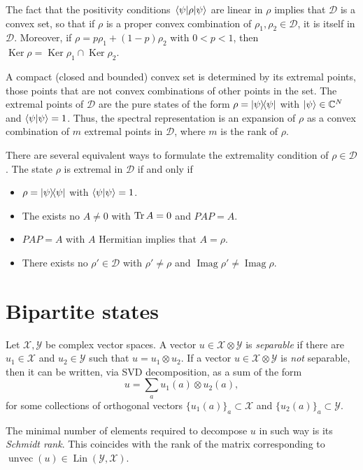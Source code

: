 \documentclass[12pt]{report}
\newcommand{\on}[1]{\operatorname{#1}}
\newcommand{\calY}{{\mathcal{Y}}}
\newcommand{\calX}{{\mathcal{X}}}
\DeclareMathOperator{\Ker}{Ker}
\DeclareMathOperator{\Imag}{Imag}
\DeclareMathOperator{\Lin}{Lin}
\begin{document}
The fact that the positivity conditions $\mel\psi\rho\psi$ are linear in $\rho$ implies that $\mathcal D$ is a convex set, so that if $\rho$ is a proper convex combination of $\rho_1, \rho_2\in \mathcal D$, it is itself in $\mathcal D$.
Moreover, if $\rho=p \rho_1 + (1-p)\rho_2$ with $0<p<1$, then
$\Ker\rho = \Ker\rho_1 \cap \Ker\rho_2$.

A compact (closed and bounded) convex set is determined by its extremal points,
those points that are not convex combinations of other points in the set.
The extremal points of $\mathcal D$ are the pure states of the form
$\rho=\ketbra\psi$ with $\ket\psi\in\mathbb C^N$ and $\braket\psi=1$.
Thus, the spectral representation is an expansion of $\rho$ as a convex combination of $m$ extremal points in $\mathcal D$, where $m$ is the rank of $\rho$.

There are several equivalent ways to formulate the extremality condition of $\rho \in\mathcal D$.
The state $\rho$ is extremal in $\mathcal D$ if and only if
\begin{itemize}
	\item $\rho = \ketbra\psi$ with $\braket\psi=1$.
	\item The exists no $A\neq 0$ with $\Tr A=0$ and $PAP=A$.
	\item $PAP=A$ with $A$ Hermitian implies that $A=\rho$.
	\item There exists no $\rho'\in\mathcal D$ with $\rho'\neq\rho$ and $\Imag\rho'\neq\Imag\rho$.
\end{itemize}

\section{Bipartite states}

\begin{defn}
	Let $\calX,\calY$ be complex vector spaces.
	A vector $u\in\calX\otimes\calY$ is \emph{separable} if there are $u_1\in\calX$ and $u_2\in\calY$ such that $u=u_1\otimes u_2$.
	If a vector $u\in\calX\otimes \calY$ is \emph{not} separable, then it can be written, via SVD decomposition, as a sum of the form
	\begin{equation}
		u = \sum_a u_1(a) \otimes u_2(a),
	\end{equation}
	for some collections of orthogonal vectors $\{u_1(a)\}_a\subset\calX$ and $\{u_2(a)\}_a\subset\calY$.

	The minimal number of elements required to decompose $u$ in such way is its \emph{Schmidt rank}.
	This coincides with the rank of the matrix corresponding to $\on{unvec}(u)\in\Lin(\calY,\calX)$.
\end{defn}
\end{document}
